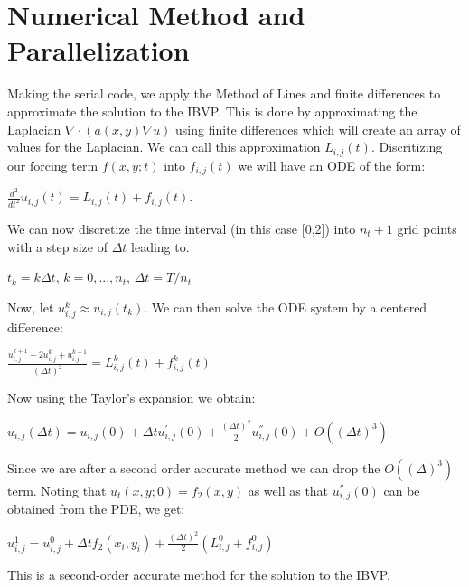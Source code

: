 \documentclass[12pt]{article}
\begin{document}
	\section{Numerical Method and Parallelization}
Making the serial code, we apply the Method of Lines and finite differences to approximate the solution to the IBVP. This is done by approximating the Laplacian $\nabla \cdot (a(x,y)\nabla u)$ using finite differences which will create an array of values for the Laplacian. We can call this approximation $L_{i,j}(t)$. Discritizing our forcing term $f(x,y;t)$ into $f_{i,j}(t)$ we will have an ODE of the form:
\begin{center}
 $\frac{d^2}{dt^2}u_{i,j}(t)=L_{i,j}(t)+f_{i,j}(t)$.
\end{center}
We can now discretize the time interval (in this case [0,2]) into $n_t+1$ grid points with a step size of $\Delta t$ leading to.
\begin{center}
	$t_k=k\Delta t$, \hspace{2mm}$k=0,...,n_t$, \hspace{2mm} $\Delta t=T/n_t$
\end{center}
Now, let $u_{i,j}^{k}\approx u_{i,j}(t_k)$. We can then solve the ODE system by a centered difference:
\begin{center}
	\large $\frac{u_{i,j}^{k+1}-2u_{i,j}^k+u_{i.j}^{k-1} }{(\Delta t)^2}=L_{i,j}^k(t)+f_{i,j}^k(t)$
\end{center}
Now using the Taylor's expansion we obtain:
\begin{center}
	$u_{i,j}(\Delta t)=u_{i,j}(0)+\Delta t u_{i,j}^{'}(0)+\frac{(\Delta t)^2}{2} u_{i,j}^{''}(0)+O((\Delta t)^3)$
\end{center}
Since we are after a second order accurate method we can drop the $O((\Delta)^3)$ term. Noting that $u_t(x,y;0)=f_2(x,y)$ as well as that $u_{i,j}^{''}(0)$ can be obtained from the PDE, we get:
\begin{center}
	$u_{i,j}^1=u_{i,j}^0+\Delta tf_2(x_i,y_i)+\frac{(\Delta t)^2}{2}(L_{i,j}^0+f_{i,j}^0)$
\end{center}
This is a second-order accurate method for the solution to the IBVP. 
\newline \newline
\end{document}
